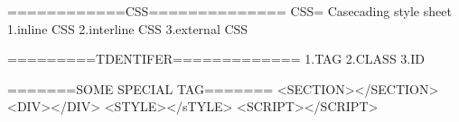 ============CSS==============
CSS= Casecading style sheet
1.inline CSS
2.interline CSS
3.external CSS


=========TDENTIFER============= 
1.TAG
2.CLASS
3.ID



=======SOME SPECIAL TAG=======
<SECTION></SECTION>
<DIV></DIV>
<STYLE></sTYLE>
<SCRIPT></SCRIPT>